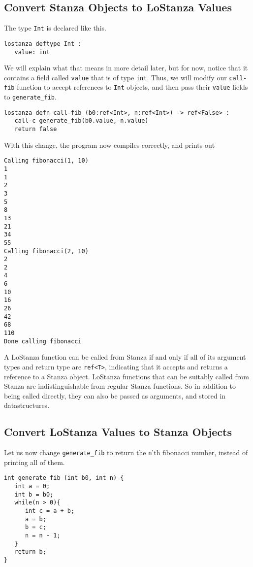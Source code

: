 \documentclass[10pt,oneside]{book}
\begin{document}
\subsection*{Convert Stanza Objects to LoStanza Values}
The type \texttt{\frenchspacing Int} is declared like this.
\begin{lstlisting}
lostanza deftype Int :
   value: int
\end{lstlisting}
We will explain what that means in more detail later, but for now, notice that it contains a field called \texttt{\frenchspacing value} that is of type \texttt{\frenchspacing int}. Thus, we will modify our \texttt{\frenchspacing call-fib} function to accept references to \texttt{\frenchspacing Int} objects, and then pass their \texttt{\frenchspacing value} fields to \texttt{\frenchspacing generate\_fib}.
\begin{lstlisting}
lostanza defn call-fib (b0:ref<Int>, n:ref<Int>) -> ref<False> :
   call-c generate_fib(b0.value, n.value)
   return false
\end{lstlisting}

With this change, the program now compiles correctly, and prints out
\begin{lstlisting}
Calling fibonacci(1, 10)
1
1
2
3
5
8
13
21
34
55
Calling fibonacci(2, 10)
2
2
4
6
10
16
26
42
68
110
Done calling fibonacci
\end{lstlisting}

A LoStanza function can be called from Stanza if and only if all of its argument types and return type are \texttt{\frenchspacing ref<T>}, indicating that it accepts and returns a reference to a Stanza object. LoStanza functions that can be suitably called from Stanza are indistinguishable from regular Stanza functions. So in addition to being called directly, they can also be passed as arguments, and stored in datastructures.

\subsection*{Convert LoStanza Values to Stanza Objects}
Let us now change \texttt{\frenchspacing generate\_fib} to return the \texttt{\frenchspacing n}'th fibonacci number, instead of printing all of them. 
\begin{lstlisting}
int generate_fib (int b0, int n) {
   int a = 0;
   int b = b0;
   while(n > 0){
      int c = a + b;
      a = b;
      b = c;
      n = n - 1;
   }
   return b;
}
\end{lstlisting}
\end{document}
